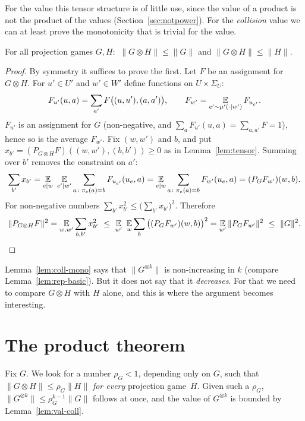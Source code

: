 \noindent
For the value this tensor structure is of little use, since the value of a product is not the product of the values (Section~\ref{sec:notpower}).  For the \emph{collision} value we can at least prove the monotonicity that is trivial for the value.

\begin{lemma}\label{lem:coll-mono}
For all projection games $G,H$: $\ \|G\otimes H\|\le\|G\|$ and $\|G\otimes H\|\le\|H\|$.
\end{lemma}
\begin{proof}
By symmetry it suffices to prove the first.  Let $F$ be an assignment for $G\otimes H$.  For $u'\in U'$ and $w'\in W'$ define functions on $U\times\Sigma_U$:
\[
  F_{u'}(u,a)=\sum_{a'}F\big((u,u'),(a,a')\big),\qquad F_{w'}=\operatorname*{\mathbb{E}}_{e'\sim\mu'(\cdot\mid w')}F_{u_{e'}}.
\]
$F_{u'}$ is an assignment for $G$ (non-negative, and $\sum_aF_{u'}(u,a)=\sum_{a,a'}F=1$), hence so is the average $F_{w'}$.
Fix $(w,w')$ and $b$, and put $x_{b'}=(P_{G\otimes H}F)((w,w'),(b,b'))\ge0$ as in Lemma~\ref{lem:tensor}.  Summing over $b'$ removes the constraint on $a'$:
\[
  \sum_{b'}x_{b'}=\operatorname*{\mathbb{E}}_{e\mid w}\ \operatorname*{\mathbb{E}}_{e'\mid w'}\sum_{a\colon\pi_e(a)=b}F_{u_{e'}}(u_e,a)=\operatorname*{\mathbb{E}}_{e\mid w}\sum_{a\colon\pi_e(a)=b}F_{w'}(u_e,a)=(P_GF_{w'})(w,b).
\]
For non-negative numbers $\sum_{b'}x_{b'}^2\le\big(\sum_{b'}x_{b'}\big)^2$.  Therefore
\[
  \|P_{G\otimes H}F\|^2=\E_{w,w'}\sum_{b,b'}x_{b'}^2\ \le\ \E_{w'}\ \E_w\sum_b\big((P_GF_{w'})(w,b)\big)^2=\E_{w'}\|P_GF_{w'}\|^2\ \le\ \|G\|^2.\qedhere
\]
\end{proof}

\noindent
Lemma~\ref{lem:coll-mono} says that $\|G^{\otimes k}\|$ is non-increasing in $k$ (compare Lemma~\ref{lem:rep-basic}).  But it does not say that it \emph{decreases}.  For that we need to compare $G\otimes H$ with $H$ alone, and this is where the argument becomes interesting.


\section{The product theorem}
\label{sec:product}

Fix $G$.  We look for a number $\rho_G<1$, depending only on $G$, such that $\|G\otimes H\|\le\rho_G\|H\|$ \emph{for every} projection game~$H$.
Given such a $\rho_G$, $\|G^{\otimes k}\|\le\rho_G^{k-1}\|G\|$ follows at once, and the value of $G^{\otimes k}$ is bounded by Lemma~\ref{lem:val-coll}.

